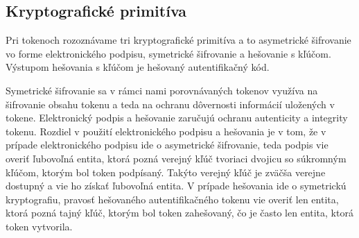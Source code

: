 \begin{table}
  \begin{center}
    \caption{Bezpečnosť tokenov}
    \label{tab:bezpecnost} %

  \end{center}
\end{table}

\subsection{Kryptografické primitíva}

Pri tokenoch rozoznávame tri kryptografické primitíva a to asymetrické šifrovanie vo forme elektronického podpisu, symetrické šifrovanie a hešovanie s kľúčom. Výstupom hešovania s kľúčom je hešovaný autentifikačný kód. 

Symetrické šifrovanie sa v rámci nami porovnávaných tokenov využíva na šifrovanie obsahu tokenu a teda na ochranu dôvernosti informácií uložených v tokene. Elektronický podpis a hešovanie zaručujú ochranu autenticity a integrity tokenu. Rozdiel v použití elektronického podpisu a hešovania je v tom, že v prípade elektronického podpisu ide o asymetrické šifrovanie, teda  podpis vie overiť ľubovoľná entita, ktorá pozná verejný kľúč tvoriaci dvojicu so súkromným kľúčom, ktorým bol token podpísaný. Takýto verejný kľúč je zväčša verejne dostupný a vie ho získať ľubovoľná entita. V prípade hešovania ide o symetrickú kryptografiu, pravosť hešovaného autentifikačného tokenu vie overiť len entita, ktorá pozná tajný kľúč, ktorým bol token zahešovaný, čo je často len entita, ktorá token vytvorila.


